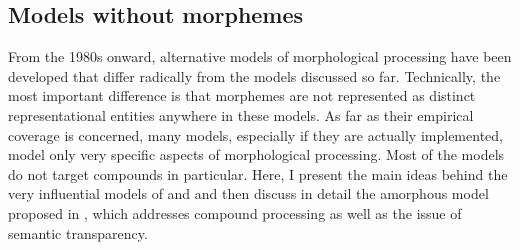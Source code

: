 


\subsection{Models without morphemes}
\label{sec:non-classical}
From the 1980s onward, alternative models of morphological
processing have been developed that differ radically from the
models discussed so far. Technically, the most important difference is
that morphemes are not represented as distinct
representational entities anywhere in these models. As far as their
empirical coverage is concerned, many
models, especially if they are actually implemented, model only very
specific aspects of morphological processing.  Most of the models
do  not target compounds in particular. Here, I present the main ideas
behind the very
influential models of \citet{RumelhartandMcClelland:1986} and
\citet{Bybee:1995} and then discuss in detail the amorphous model
proposed in \citet{Baayenetal:2011}, which addresses compound
processing as well as the issue of semantic transparency.



